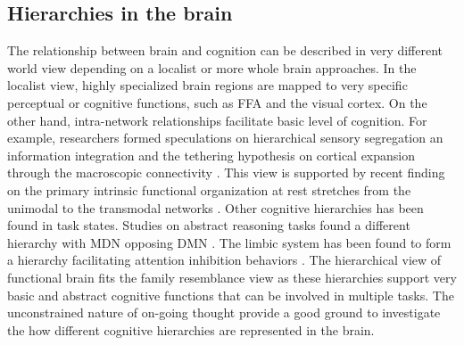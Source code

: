 \subsection{Hierarchies in the brain}
The relationship between brain and cognition can be described in very different world view depending on a localist or more whole brain approaches. In the localist view, highly specialized brain regions are mapped to very specific perceptual or cognitive functions, such as FFA and the visual cortex. On the other hand, intra-network relationships facilitate basic level of cognition. For example, researchers formed speculations on hierarchical sensory segregation an information integration \cite{Mesulam1998} and the tethering hypothesis on cortical expansion through the macroscopic connectivity \cite{Buckner2013}. This view is supported by recent finding on the primary intrinsic functional organization at rest stretches from the unimodal to the transmodal networks \cite{Margulies2016}. Other cognitive hierarchies has been found in task states. Studies on abstract reasoning tasks found a different hierarchy with MDN opposing DMN \cite{Duncan2010}. The limbic system has been found to form a hierarchy facilitating attention inhibition behaviors \cite{Kleckner2017}. The hierarchical view of functional brain fits the family resemblance view as these hierarchies support very basic and abstract cognitive functions that can be involved in multiple tasks. The unconstrained nature of on-going thought provide a good ground to investigate the how different cognitive hierarchies are represented in the brain.

